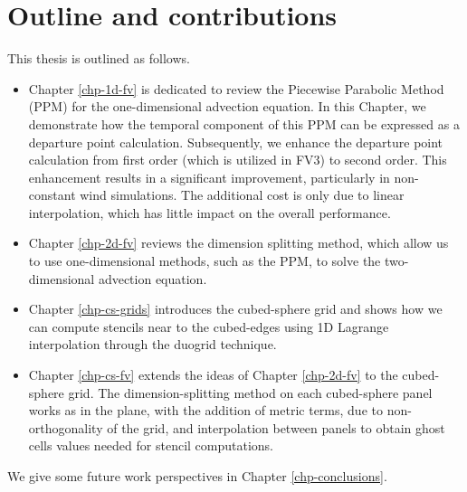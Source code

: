 \section{Outline and contributions}
This thesis is outlined as follows.
\begin{itemize}
\item Chapter \ref{chp-1d-fv} is dedicated to review the Piecewise Parabolic Method (PPM)
for the one-dimensional advection equation. 
In this Chapter, we demonstrate how the temporal component of this PPM can be expressed as a departure point calculation.
Subsequently, we enhance the departure point calculation from first order (which is utilized in FV3) to second order.
This enhancement results in a significant improvement, particularly in non-constant wind simulations.
The additional cost is only due to linear interpolation, which has little impact on the overall performance.
\item Chapter \ref{chp-2d-fv} reviews the dimension splitting method, which allow us to use 
one-dimensional methods, such as the PPM, to solve the two-dimensional advection equation.
\item Chapter \ref{chp-cs-grids} introduces the cubed-sphere grid and shows how we can compute stencils
near to the cubed-edges using 1D Lagrange interpolation through the duogrid technique.
\item Chapter \ref{chp-cs-fv} extends the ideas of Chapter \ref{chp-2d-fv} to the cubed-sphere grid.
The dimension-splitting method on each cubed-sphere panel works as in the plane, with the addition
of metric terms, due to non-orthogonality of the grid, and interpolation between panels
to obtain ghost cells values needed for stencil computations.
\end{itemize}
We give some future work perspectives in Chapter \ref{chp-conclusions}.